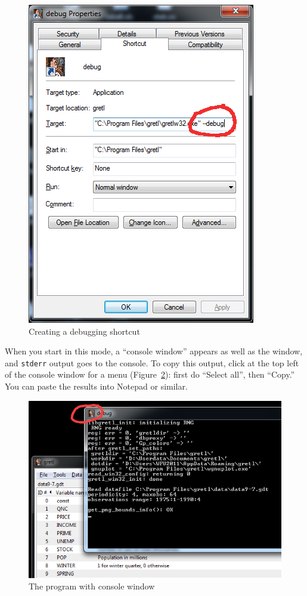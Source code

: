 \begin{figure}[htbp]
  \centering
  \caption{Creating a debugging shortcut}
  \vspace{1ex}
  \label{fig:gretl-shortcut}
  \includegraphics[scale=0.8]{figures/gretl-shortcut}
\end{figure}

When you start  in this mode, a ``console window'' appears
as well as the  window, and \texttt{stderr} output goes to
the console. To copy this output, click at the top left of the console
window for a menu (Figure~\ref{fig:gretl-debug}): first do ``Select all'',
then ``Copy.'' You can paste the results into Notepad or similar.

\begin{figure}[htbp]
  \centering
  \caption{The program with console window}
  \label{fig:gretl-debug}
  \includegraphics[scale=0.8]{figures/gretl-debug}
\end{figure}


